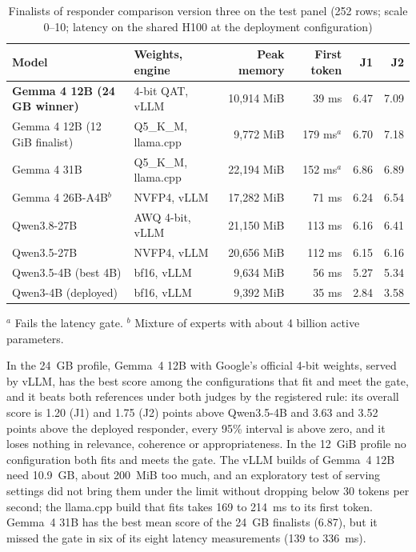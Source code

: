 \begin{table}[ht]
\centering
\caption{Finalists of responder comparison version three on the test panel (252 rows; scale
         0--10; latency on the shared H100 at the deployment configuration)}
\label{tab:resp-v3}
\small
\setlength{\tabcolsep}{4pt}
\begin{tabular}{llrrrr}
\toprule
Model & Weights, engine & Peak memory & First token & J1 & J2 \\
\midrule
\textbf{Gemma 4 12B (24 GB winner)} & 4-bit QAT, vLLM & 10,914 MiB & 39 ms & 6.47 & 7.09 \\
Gemma 4 12B (12 GiB finalist) & Q5\_K\_M, llama.cpp & 9,772 MiB & 179 ms$^{a}$ & 6.70 & 7.18 \\
Gemma 4 31B & Q5\_K\_M, llama.cpp & 22,194 MiB & 152 ms$^{a}$ & 6.86 & 6.89 \\
Gemma 4 26B-A4B$^{b}$ & NVFP4, vLLM & 17,282 MiB & 71 ms & 6.24 & 6.54 \\
Qwen3.8-27B & AWQ 4-bit, vLLM & 21,150 MiB & 113 ms & 6.16 & 6.41 \\
Qwen3.5-27B & NVFP4, vLLM & 20,656 MiB & 112 ms & 6.15 & 6.16 \\
Qwen3.5-4B (best 4B) & bf16, vLLM & 9,634 MiB & 56 ms & 5.27 & 5.34 \\
Qwen3-4B (deployed) & bf16, vLLM & 9,392 MiB & 35 ms & 2.84 & 3.58 \\
\bottomrule
\end{tabular}
\par\smallskip\footnotesize
$^{a}$ Fails the latency gate.
$^{b}$ Mixture of experts with about 4 billion active parameters.
\end{table}

In the 24~GB profile, Gemma~4 12B with Google's official 4-bit weights, served by vLLM,
has the best score among the configurations that fit and meet the gate, and it beats both
references under both judges by the registered rule: its overall score is 1.20 (J1) and 1.75
(J2) points above Qwen3.5-4B and 3.63 and 3.52 points above the deployed responder, every
95\% interval is above zero, and it loses nothing in relevance, coherence or appropriateness.
In the 12~GiB profile no configuration both fits and meets the gate. The vLLM builds of
Gemma~4 12B need 10.9~GB, about 200~MiB too much, and an exploratory test of serving
settings did not bring them under the limit without dropping below 30 tokens per second; the
llama.cpp build that fits takes 169 to 214~ms to its first token. Gemma~4 31B has the best
mean score of the 24~GB finalists (6.87), but it missed the gate in six of its eight latency
measurements (139 to 336~ms).

